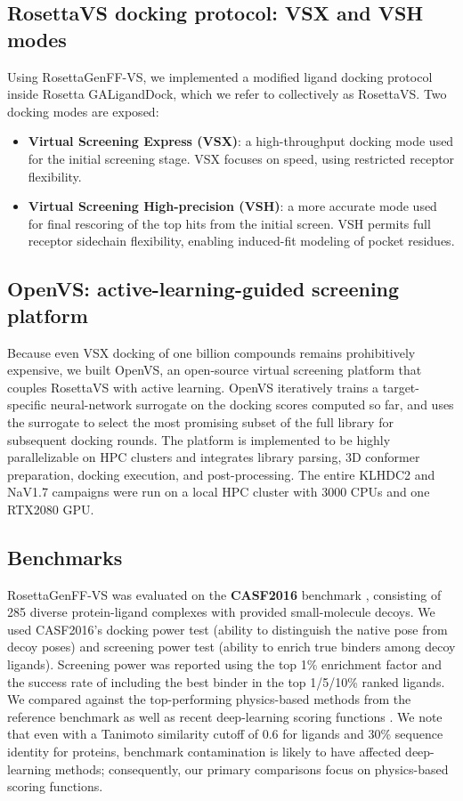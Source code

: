 \documentclass[11pt]{article}
\begin{document}
\subsection{RosettaVS docking protocol: VSX and VSH modes}
Using RosettaGenFF-VS, we implemented a modified ligand docking protocol inside Rosetta GALigandDock, which we refer to collectively as RosettaVS. Two docking modes are exposed:
\begin{itemize}
    \item \textbf{Virtual Screening Express (VSX)}: a high-throughput docking mode used for the initial screening stage. VSX focuses on speed, using restricted receptor flexibility.
    \item \textbf{Virtual Screening High-precision (VSH)}: a more accurate mode used for final rescoring of the top hits from the initial screen. VSH permits full receptor sidechain flexibility, enabling induced-fit modeling of pocket residues.
\end{itemize}

\subsection{OpenVS: active-learning-guided screening platform}
Because even VSX docking of one billion compounds remains prohibitively expensive, we built OpenVS, an open-source virtual screening platform that couples RosettaVS with active learning. OpenVS iteratively trains a target-specific neural-network surrogate on the docking scores computed so far, and uses the surrogate to select the most promising subset of the full library for subsequent docking rounds. The platform is implemented to be highly parallelizable on HPC clusters and integrates library parsing, 3D conformer preparation, docking execution, and post-processing. The entire KLHDC2 and NaV1.7 campaigns were run on a local HPC cluster with 3000 CPUs and one RTX2080 GPU.

\subsection{Benchmarks}
RosettaGenFF-VS was evaluated on the \textbf{CASF2016} benchmark \citep{su2019casf2016}, consisting of 285 diverse protein-ligand complexes with provided small-molecule decoys. We used CASF2016's docking power test (ability to distinguish the native pose from decoy poses) and screening power test (ability to enrich true binders among decoy ligands). Screening power was reported using the top 1\% enrichment factor and the success rate of including the best binder in the top 1/5/10\% ranked ligands. We compared against the top-performing physics-based methods from the reference benchmark \citep{su2019casf2016,li2018casf2016comprehensive,wang2017improving} as well as recent deep-learning scoring functions \citep{jimenez2018kdeep,meli2023scoring}. We note that even with a Tanimoto similarity cutoff of 0.6 for ligands and 30\% sequence identity for proteins, benchmark contamination is likely to have affected deep-learning methods; consequently, our primary comparisons focus on physics-based scoring functions.
\end{document}
